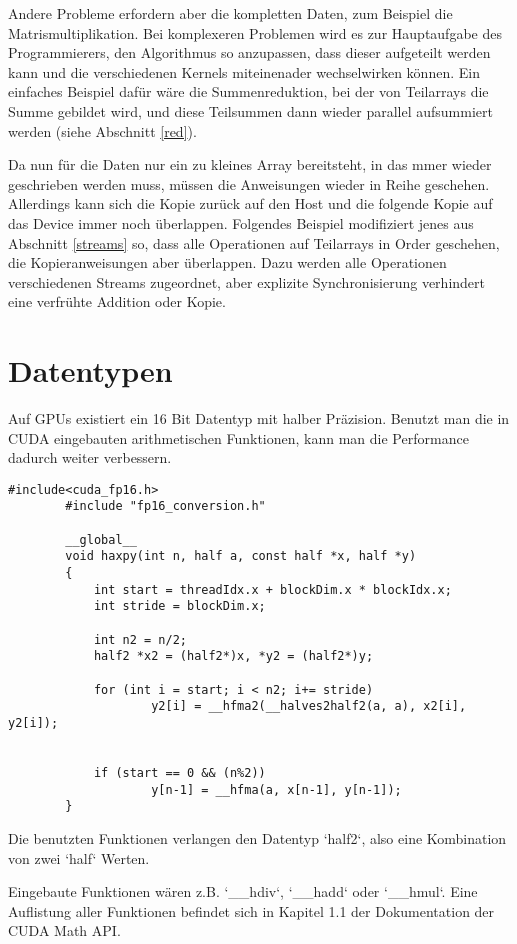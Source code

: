 		Andere Probleme erfordern aber die kompletten Daten, zum Beispiel die Matrismultiplikation. Bei komplexeren Problemen wird es zur Hauptaufgabe des Programmierers, den Algorithmus so anzupassen, dass dieser aufgeteilt werden kann und die verschiedenen \Glspl{Kernel} miteinenader wechselwirken können. Ein einfaches Beispiel dafür wäre die Summenreduktion, bei der von Teilarrays die Summe gebildet wird, und diese Teilsummen dann wieder parallel aufsummiert werden (siehe Abschnitt \ref{red}). 
		
		Da nun für die Daten nur ein zu kleines Array bereitsteht, in das mmer wieder geschrieben werden muss, müssen die Anweisungen wieder in Reihe geschehen. Allerdings kann sich die Kopie zurück auf den Host und die folgende Kopie auf das Device immer noch überlappen. Folgendes Beispiel modifiziert jenes aus Abschnitt \ref{streams} so, dass alle Operationen auf Teilarrays in Order geschehen, die Kopieranweisungen aber überlappen. Dazu werden alle Operationen verschiedenen \Glspl{Stream} zugeordnet, aber explizite Synchronisierung verhindert eine verfrühte Addition oder Kopie.
		
		\section{Datentypen}
		Auf GPUs existiert ein 16 Bit Datentyp mit halber Präzision. Benutzt man die in CUDA eingebauten arithmetischen Funktionen, kann man die Performance dadurch weiter verbessern.			
		\begin{lstlisting}[caption=Half Precision]
		#include<cuda_fp16.h>
		#include "fp16_conversion.h"
		
		__global__
		void haxpy(int n, half a, const half *x, half *y)
		{
    		int start = threadIdx.x + blockDim.x * blockIdx.x;
    		int stride = blockDim.x;

			int n2 = n/2;
			half2 *x2 = (half2*)x, *y2 = (half2*)y;

			for (int i = start; i < n2; i+= stride) 
					y2[i] = __hfma2(__halves2half2(a, a), x2[i], y2[i]);


			if (start == 0 && (n%2))
					y[n-1] = __hfma(a, x[n-1], y[n-1]);
		}
		\end{lstlisting}
		
	    Die benutzten Funktionen verlangen den Datentyp \li`half2`, also eine Kombination von zwei \li`half` Werten.
	    
		Eingebaute Funktionen wären z.B. \li`__hdiv`, \li`__hadd` oder \li`__hmul`. Eine Auflistung aller Funktionen befindet sich in Kapitel 1.1 der Dokumentation der CUDA Math \Gls{API}. \autocite{cudaMath}
		
